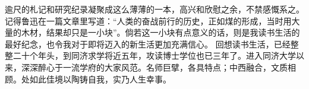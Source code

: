 \begin{ack}\fs
逾尺的札记和研究纪录凝聚成这么薄薄的一本，高兴和欣慰之余，不禁感慨系之。记得鲁迅在一篇文章里写道：“人类的奋战前行的历史，正如煤的形成，当时用大量的木材，结果却只是一小块”。倘若这一小块有点意义的话，则是我读书生活的最好纪念，也令我对于即将迈入的新生活更加充满信心。
回想读书生活，已经整整二十个年头，到同济求学将近五年，攻读博士学位也已三年了。进入同济大学以来，深深醉心于一流学府的大家风范。名师巨擘，各具特点；中西融合，文质相顾。处如此佳境以陶铸自我，实乃人生幸事。

\ackdate
\end{ack}
